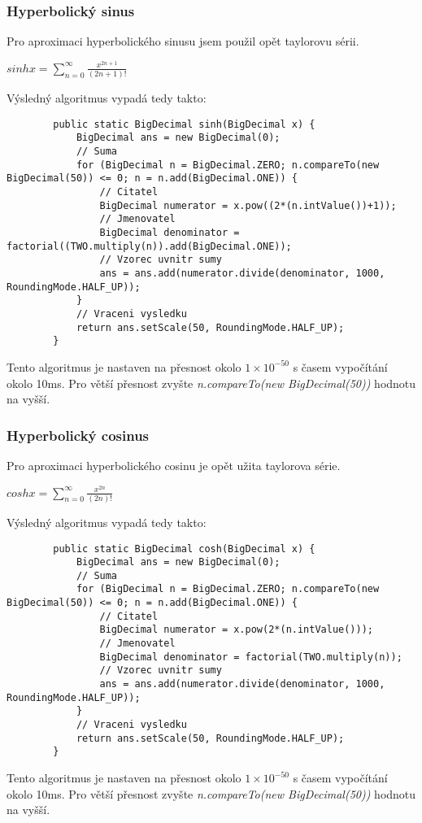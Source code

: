\documentclass{article}
\begin{document}
    \subsubsection{Hyperbolický sinus}
    Pro aproximaci hyperbolického sinusu jsem použil opět taylorovu sérii.
    \begin{center}
        $sinh x = \displaystyle\sum_{n=0}^{\infty}\frac{x^{2n+1}}{(2n+1)!}$
    \end{center}
    Výsledný algoritmus vypadá tedy takto:
    \newline
    \begin{lstlisting}
        public static BigDecimal sinh(BigDecimal x) {
            BigDecimal ans = new BigDecimal(0);
            // Suma
            for (BigDecimal n = BigDecimal.ZERO; n.compareTo(new BigDecimal(50)) <= 0; n = n.add(BigDecimal.ONE)) {
                // Citatel
                BigDecimal numerator = x.pow((2*(n.intValue())+1));
                // Jmenovatel
                BigDecimal denominator = factorial((TWO.multiply(n)).add(BigDecimal.ONE));
                // Vzorec uvnitr sumy
                ans = ans.add(numerator.divide(denominator, 1000, RoundingMode.HALF_UP));
            }
            // Vraceni vysledku
            return ans.setScale(50, RoundingMode.HALF_UP);
        }
    \end{lstlisting}
    Tento algoritmus je nastaven na přesnost okolo $1\times{10^{-50}}$ s časem vypočítání okolo 10ms. Pro
    větší přesnost zvyšte \textit{n.compareTo(new BigDecimal(50))} hodnotu na vyšší.
    \subsubsection{Hyperbolický cosinus}
    Pro aproximaci hyperbolického cosinu je opět užita taylorova série.
    \begin{center}
        $cosh x = \displaystyle\sum_{n=0}^{\infty}\frac{x^{2n}}{(2n)!}$
    \end{center}
    Výsledný algoritmus vypadá tedy takto:
    \begin{lstlisting}
        public static BigDecimal cosh(BigDecimal x) {
            BigDecimal ans = new BigDecimal(0);
            // Suma 
            for (BigDecimal n = BigDecimal.ZERO; n.compareTo(new BigDecimal(50)) <= 0; n = n.add(BigDecimal.ONE)) {
                // Citatel
                BigDecimal numerator = x.pow(2*(n.intValue()));
                // Jmenovatel
                BigDecimal denominator = factorial(TWO.multiply(n));
                // Vzorec uvnitr sumy
                ans = ans.add(numerator.divide(denominator, 1000, RoundingMode.HALF_UP));
            }
            // Vraceni vysledku
            return ans.setScale(50, RoundingMode.HALF_UP);
        }
    \end{lstlisting}
    Tento algoritmus je nastaven na přesnost okolo $1\times{10^{-50}}$ s časem vypočítání okolo 10ms. Pro
    větší přesnost zvyšte \textit{n.compareTo(new BigDecimal(50))} hodnotu na vyšší.
\end{document}
